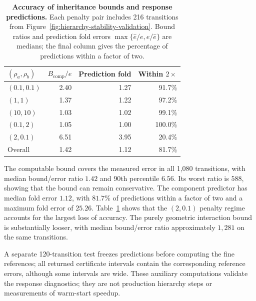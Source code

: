 \begin{table}[t]
\centering
\caption{\textbf{Accuracy of inheritance bounds and response predictions.}
Each penalty pair includes 216 transitions from Figure~\ref{fig:hierarchy-stability-validation}.
Bound ratios and prediction fold errors $\max\{\widehat e/e,e/\widehat e\}$ are medians; the final column gives the percentage of predictions within a factor of two.}
\label{tab:stability-diagnostics}
\small
\setlength{\tabcolsep}{7pt}
\begin{tabular}{lrrr}
\toprule
$(\rho_a,\rho_b)$ & $B_{\mathrm{comp}}/e$ & Prediction fold & Within $2\times$ \\
\midrule
$(0.1,0.1)$ & 2.40 & 1.27 & 91.7\% \\
$(1,1)$ & 1.37 & 1.22 & 97.2\% \\
$(10,10)$ & 1.03 & 1.02 & 99.1\% \\
$(0.1,2)$ & 1.05 & 1.00 & 100.0\% \\
$(2,0.1)$ & 6.51 & 3.95 & 20.4\% \\
\midrule
Overall & 1.42 & 1.12 & 81.7\% \\
\bottomrule
\end{tabular}

\end{table}

The computable bound covers the measured error in all 1,080 transitions, with median bound/error ratio $1.42$ and 90th percentile $6.56$.
Its worst ratio is $588$, showing that the bound can remain conservative.
The component predictor has median fold error $1.12$, with $81.7\%$ of predictions within a factor of two and a maximum fold error of $25.26$.
Table~\ref{tab:stability-diagnostics} shows that the $(2,0.1)$ penalty regime accounts for the largest loss of accuracy.
The purely geometric interaction bound is substantially looser, with median bound/error ratio approximately $1{,}281$ on the same transitions.

A separate 120-transition test freezes predictions before computing the fine references; all returned certificate intervals contain the corresponding reference errors, although some intervals are wide.
These auxiliary computations validate the response diagnostics; they are not production hierarchy steps or measurements of warm-start speedup.

